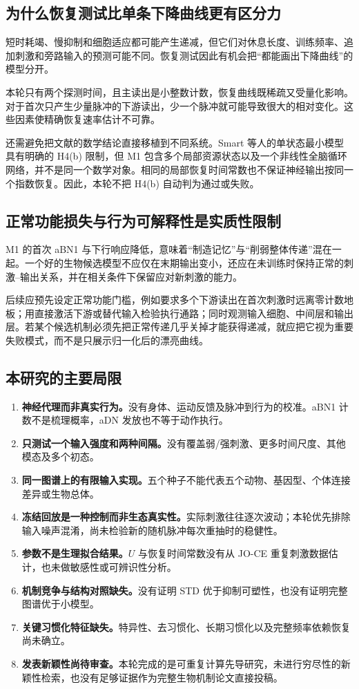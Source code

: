 \subsection{为什么恢复测试比单条下降曲线更有区分力}
短时耗竭、慢抑制和细胞适应都可能产生递减，但它们对休息长度、训练频率、追加刺激和旁路输入的预测可能不同。恢复测试因此有机会把“都能画出下降曲线”的模型分开。

本轮只有两个探测时间，且主读出是小整数计数，恢复曲线既稀疏又受量化影响。对于首次只产生少量脉冲的下游读出，少一个脉冲就可能导致很大的相对变化。这些因素使精确恢复速率估计不可靠。

还需避免把文献的数学结论直接移植到不同系统。Smart 等人的单状态最小模型具有明确的 H4(b) 限制\citep{smart2024}，但 M1 包含多个局部资源状态以及一个非线性全脑循环网络，并不是同一个数学对象。相同的局部恢复时间常数也不保证神经输出按同一个指数恢复。因此，本轮不把 H4(b) 自动判为通过或失败。

\subsection{正常功能损失与行为可解释性是实质性限制}
M1 的首次 aBN1 与下行响应降低，意味着“制造记忆”与“削弱整体传递”混在一起。一个好的生物候选模型不应仅在末期输出变小，还应在未训练时保持正常的刺激--输出关系，并在相关条件下保留应对新刺激的能力。

后续应预先设定正常功能门槛，例如要求多个下游读出在首次刺激时远离零计数地板；用直接激活下游或替代输入检验执行通路；同时观测输入细胞、中间层和输出层。若某个候选机制必须先把正常传递几乎关掉才能获得递减，就应把它视为重要失败模式，而不是只展示归一化后的漂亮曲线。

\subsection{本研究的主要局限}
\begin{enumerate}
\item \textbf{神经代理而非真实行为。}没有身体、运动反馈及脉冲到行为的校准。aBN1 计数不是梳理概率，aDN 发放也不等于动作执行。
\item \textbf{只测试一个输入强度和两种间隔。}没有覆盖弱/强刺激、更多时间尺度、其他模态及多个初态。
\item \textbf{同一图谱上的有限输入实现。}五个种子不能代表五个动物、基因型、个体连接差异或生物总体。
\item \textbf{冻结回放是一种控制而非生态真实性。}实际刺激往往逐次波动；本轮优先排除输入噪声混淆，尚未检验新的随机脉冲每次重抽时的稳健性。
\item \textbf{参数不是生理拟合结果。}$U$ 与恢复时间常数没有从 JO-CE 重复刺激数据估计，也未做敏感性或可辨识性分析。
\item \textbf{机制竞争与结构对照缺失。}没有证明 STD 优于抑制可塑性，也没有证明完整图谱优于小模型。
\item \textbf{关键习惯化特征缺失。}特异性、去习惯化、长期习惯化以及完整频率依赖恢复尚未确立。
\item \textbf{发表新颖性尚待审查。}本轮完成的是可重复计算先导研究，未进行穷尽性的新颖性检索，也没有足够证据作为完整生物机制论文直接投稿。
\end{enumerate}

